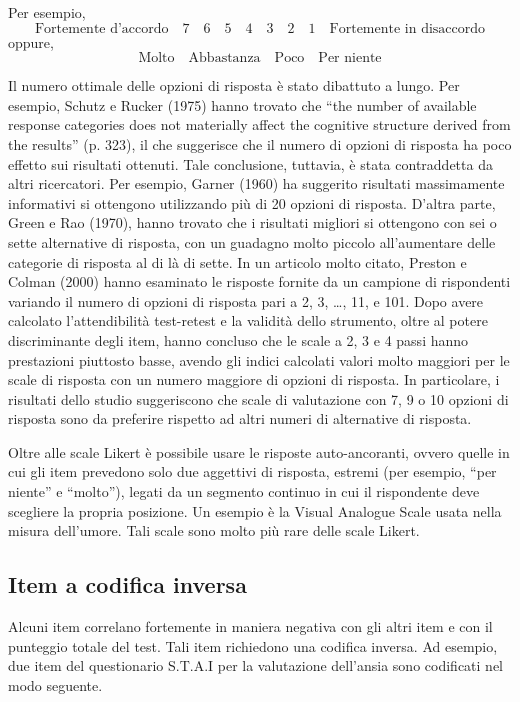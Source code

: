 Per esempio,
\[
\text{Fortemente d'accordo} \quad 7\quad 6 \quad 5 \quad 4 \quad 3 \quad 2 \quad 1 \quad \text{Fortemente in disaccordo}
\]
oppure,
\[
\text{Molto} \quad \text{Abbastanza}\quad \text{Poco} \quad \text{Per niente}
\]

Il numero ottimale delle opzioni di risposta è stato dibattuto a lungo. Per esempio, Schutz e Rucker (1975) hanno trovato che ``the number of available response categories does not materially affect the cognitive structure derived from the results'' (p. 323), il che suggerisce che il numero di opzioni di risposta ha poco effetto sui risultati ottenuti. Tale conclusione, tuttavia, è stata contraddetta da altri ricercatori.  Per esempio, Garner (1960) ha suggerito risultati massimamente informativi si ottengono utilizzando più di 20 opzioni di risposta. D'altra parte, Green e Rao (1970), hanno trovato che i risultati migliori si ottengono con sei o sette alternative di risposta, con un guadagno molto piccolo all'aumentare delle categorie di risposta al di là di sette. In un articolo molto citato, Preston e Colman (2000) hanno esaminato le risposte fornite da un campione di rispondenti variando il numero di opzioni di risposta pari a 2, 3, \dots, 11, e 101. Dopo avere calcolato l'attendibilità test-retest e la validità dello strumento, oltre al potere discriminante degli item, hanno concluso che le scale a 2, 3 e 4 passi hanno prestazioni piuttosto basse, avendo gli indici calcolati valori molto maggiori per le scale di risposta con un numero maggiore di opzioni di risposta. In particolare, i risultati dello studio suggeriscono che scale di valutazione con 7, 9 o 10 opzioni di risposta sono da preferire rispetto ad altri numeri di alternative di risposta.

Oltre alle scale Likert è possibile usare le risposte auto-ancoranti, ovvero quelle in cui gli item prevedono solo due aggettivi di risposta, estremi (per esempio, ``per niente'' e ``molto''), legati da un segmento continuo in cui il rispondente deve scegliere la propria posizione. Un esempio è la Visual Analogue Scale usata nella misura dell'umore. Tali scale sono molto più rare delle scale Likert.


\subsection{Item a codifica inversa}

Alcuni item correlano fortemente in maniera negativa con gli altri item e con il punteggio totale del test. Tali item richiedono una codifica inversa. Ad esempio, due item del questionario S.T.A.I per la valutazione dell'ansia sono codificati nel modo seguente.

